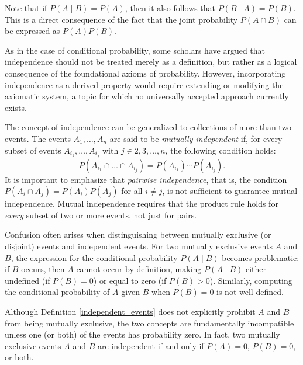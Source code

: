 Note that if $P \left( A \mid B \right) = P \left( A \right)$, then it also follows that $P \left( B \mid A \right) = P \left( B \right)$. This is a direct consequence of the fact that the joint probability $P \left( A \cap B \right)$ can be expressed as $P \left( A \right) P \left( B \right)$.

As in the case of conditional probability, some scholars have argued that independence should not be treated merely as a definition, but rather as a logical consequence of the foundational axioms of probability. However, incorporating independence as a derived property would require extending or modifying the axiomatic system, a topic for which no universally accepted approach currently exists.

The concept of independence can be generalized to collections of more than two events. The events $A_{1}, \ldots, A_{n}$ are said to be \emph{mutually independent} if, for every subset of events $A_{i_1}, \ldots, A_{i_j}$ with $j \in {2, 3, \ldots, n}$, the following condition holds:
\[
P \left( A_{i_1} \cap \ldots \cap A_{i_j} \right) = P \left( A_{i_1} \right) \cdots P \left( A_{i_j} \right).
\]
It is important to emphasize that \emph{pairwise independence}, that is, the condition $P(A_i \cap A_j) = P(A_i)P(A_j)$ for all $i \neq j$, is not sufficient to guarantee mutual independence. Mutual independence requires that the product rule holds for \emph{every} subset of two or more events, not just for pairs.

\begin{example}
Confusion often arises when distinguishing between mutually exclusive (or disjoint) events and independent events. For two mutually exclusive events $A$ and $B$, the expression for the conditional probability $P(A \mid B)$ becomes problematic: if $B$ occurs, then $A$ cannot occur by definition, making $P(A \mid B)$ either undefined (if $P(B) = 0$) or equal to zero (if $P(B) > 0$). Similarly, computing the conditional probability of $A$ given $B$ when $P(B) = 0$ is not well-defined.

Although Definition \ref{independent_events} does not explicitly prohibit $A$ and $B$ from being mutually exclusive, the two concepts are fundamentally incompatible unless one (or both) of the events has probability zero. In fact, two mutually exclusive events $A$ and $B$ are independent if and only if $P(A) = 0$, $P(B) = 0$, or both.
\end{example}

